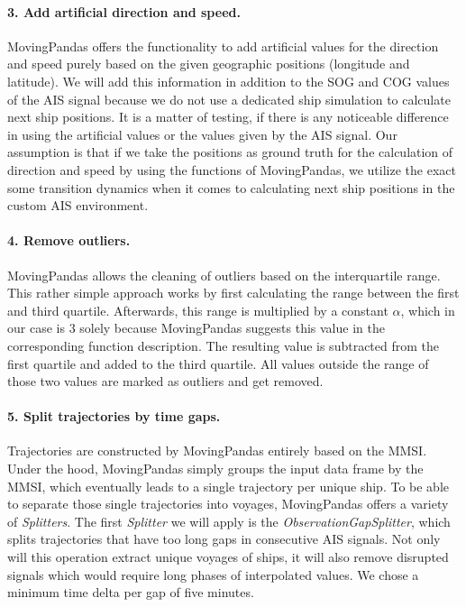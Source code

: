 \paragraph{3. Add artificial direction and speed.}
MovingPandas offers the functionality to add artificial values for the direction and speed purely based on the given geographic positions (longitude and latitude). We will add this information in addition to the SOG and COG values of the AIS signal because we do not use a dedicated ship simulation to calculate next ship positions. It is a matter of testing, if there is any noticeable difference in using the artificial values or the values given by the AIS signal. Our assumption is that if we take the positions as ground truth for the calculation of direction and speed by using the functions of MovingPandas, we utilize the exact some transition dynamics when it comes to calculating next ship positions in the custom AIS environment.

\paragraph{4. Remove outliers.}
MovingPandas allows the cleaning of outliers based on the interquartile range. This rather simple approach works by first calculating the range between the first and third quartile. Afterwards, this range is multiplied by a constant $\alpha$, which in our case is $3$ solely because MovingPandas suggests this value in the corresponding function description. The resulting value is subtracted from the first quartile and added to the third quartile. All values outside the range of those two values are marked as outliers and get removed.

\paragraph{5. Split trajectories by time gaps.}
Trajectories are constructed by MovingPandas entirely based on the MMSI. Under the hood, MovingPandas simply groups the input data frame by the MMSI, which eventually leads to a single trajectory per unique ship. To be able to separate those single trajectories into voyages, MovingPandas offers a variety of \textit{Splitters}. The first \textit{Splitter} we will apply is the \textit{ObservationGapSplitter}, which splits trajectories that have too long gaps in consecutive AIS signals. Not only will this operation extract unique voyages of ships, it will also remove disrupted signals which would require long phases of interpolated values.
We chose a minimum time delta per gap of five minutes.

